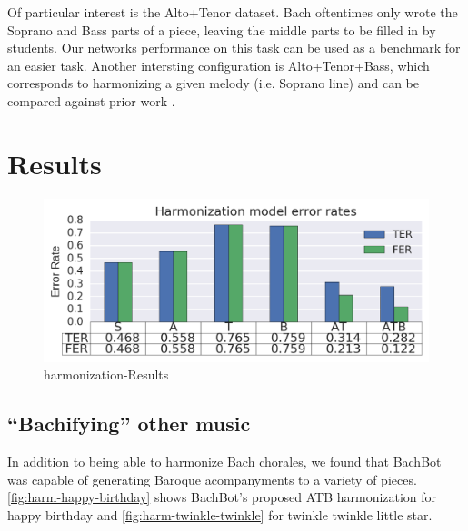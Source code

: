 
Of particular interest is the Alto+Tenor dataset. Bach oftentimes only wrote
the Soprano and Bass parts of a piece, leaving the middle parts to be filled in
by students. Our networks performance on this task can be used as a benchmark
for an easier task. Another intersting configuration is Alto+Tenor+Bass, which
corresponds to harmonizing a given melody (i.e. Soprano line) and can be
compared against prior work .

\section{Results}



\begin{figure}[htpb]
  \centering
  \includegraphics[width=1.0\linewidth]{harmonization-results.png}
  \caption{harmonization-Results}
  \label{fig:harmonization-results}
\end{figure}

\subsection{``Bachifying'' other music}

In addition to being able to harmonize Bach chorales, we found that BachBot was capable
of generating Baroque acompanyments to a variety of pieces. \cref{fig:harm-happy-birthday}
shows BachBot's proposed ATB harmonization for happy birthday
and \cref{fig:harm-twinkle-twinkle} for twinkle twinkle little star.

